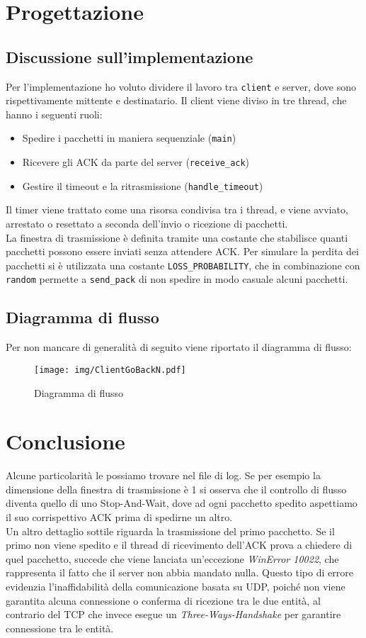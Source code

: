 \documentclass[a4paper,12pt]{report}
\begin{document}
\chapter{Progettazione}

\section{Discussione sull'implementazione}
Per l'implementazione ho voluto dividere il lavoro tra \texttt{client} e server,
dove sono rispettivamente mittente e destinatario. Il client viene diviso in tre thread,
che hanno i seguenti ruoli:
\begin{itemize}
  \item Spedire i pacchetti in maniera sequenziale (\texttt{main})
  \item Ricevere gli ACK da parte del server (\texttt{receive\_ack})
  \item Gestire il timeout e la ritrasmissione (\texttt{handle\_timeout})
\end{itemize}
Il timer viene trattato come una risorsa condivisa tra i thread, e viene avviato, arrestato o resettato a seconda dell'invio o ricezione di pacchetti.\\
La finestra di trasmissione è definita tramite una costante che stabilisce quanti pacchetti possono essere inviati senza attendere ACK.
Per simulare la perdita dei pacchetti si è utilizzata una costante
\texttt{LOSS\_PROBABILITY}, che in combinazione con \texttt{random}
permette a \texttt{send\_pack} di non spedire in modo casuale alcuni pacchetti.\\

\section{Diagramma di flusso}
Per non mancare di generalità di seguito viene riportato il diagramma di flusso:
\begin{figure}
  \centering
  \texttt{[image: img/ClientGoBackN.pdf]}
  \caption{Diagramma di flusso}
  \label{fig:client}
\end{figure}


\chapter{Conclusione}
Alcune particolarità le possiamo trovare nel file di log.
Se per esempio la dimensione della finestra di trasmissione è 1
si osserva che il controllo di flusso diventa quello di
uno Stop-And-Wait, dove ad ogni pacchetto spedito aspettiamo il suo 
corrispettivo ACK prima di spedirne un altro.\\
Un altro dettaglio sottile riguarda la trasmissione del primo pacchetto.
Se il primo non viene spedito e il thread di ricevimento dell'ACK prova
a chiedere di quel pacchetto, succede che viene lanciata un'eccezione
\textit{WinError 10022}, che rappresenta il fatto che il server non abbia mandato nulla.
Questo tipo di errore evidenzia l’inaffidabilità della 
comunicazione basata su UDP, poiché non viene garantita 
alcuna connessione o conferma di ricezione tra le due entità, al contrario del TCP che invece
esegue un \textit{Three-Ways-Handshake} per garantire connessione tra le entità.
\end{document}
